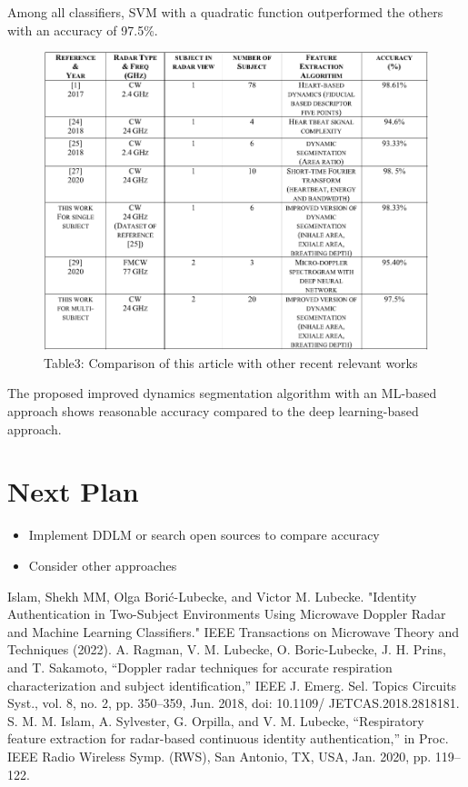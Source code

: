 \documentclass[dvipdfmx]{article}
\begin{document}
Among all classifiers, SVM with a quadratic function outperformed the others with an accuracy of 97.5\%.


\begin{figure}[H]
\caption*{Table3: Comparison of this article with other recent relevant works}
\begin{center}
\includegraphics[width=\linewidth]{./img/result_comparison_respi.png}
\end{center}
\end{figure}

The proposed improved dynamics segmentation algorithm with an ML-based approach shows reasonable accuracy compared to the deep learning-based approach.

\section{Next Plan}
\begin{itemize}
    \item Implement DDLM or search open sources to compare accuracy
    \item Consider other approaches
\end{itemize}

\begin{thebibliography}{99}
\bibitem Islam, Shekh MM, Olga Borić-Lubecke, and Victor M. Lubecke. "Identity Authentication in Two-Subject Environments Using Microwave Doppler Radar and Machine Learning Classifiers." IEEE Transactions on Microwave Theory and Techniques (2022).
\bibitem A. Ragman, V. M. Lubecke, O. Boric-Lubecke, J. H. Prins, and
T. Sakamoto, “Doppler radar techniques for accurate respiration characterization
and subject identification,” IEEE J. Emerg. Sel. Topics
Circuits Syst., vol. 8, no. 2, pp. 350–359, Jun. 2018, doi: 10.1109/
JETCAS.2018.2818181.
\bibitem S. M. M. Islam, A. Sylvester, G. Orpilla, and V. M. Lubecke, “Respiratory
feature extraction for radar-based continuous identity authentication,”
in Proc. IEEE Radio Wireless Symp. (RWS), San Antonio, TX,
USA, Jan. 2020, pp. 119–122.
\end{thebibliography}
\end{document}
